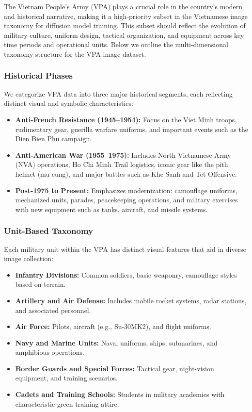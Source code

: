 \documentclass[conference]{IEEEtran}
\begin{document}
The Vietnam People's Army (VPA) plays a crucial role in the country's modern and historical narrative, making it a high-priority subset in the Vietnamese image taxonomy for diffusion model training. This subset should reflect the evolution of military culture, uniform design, tactical organization, and equipment across key time periods and operational units. Below we outline the multi-dimensional taxonomy structure for the VPA image dataset.

\subsubsection{Historical Phases}

We categorize VPA data into three major historical segments, each reflecting distinct visual and symbolic characteristics:

\begin{itemize}
	\item \textbf{Anti-French Resistance (1945--1954):} Focus on the Viet Minh troops, rudimentary gear, guerilla warfare uniforms, and important events such as the Dien Bien Phu campaign.
	\item \textbf{Anti-American War (1955--1975):} Includes North Vietnamese Army (NVA) operations, Ho Chi Minh Trail logistics, iconic gear like the pith helmet (mu cung), and major battles such as Khe Sanh and Tet Offensive.
	\item \textbf{Post-1975 to Present:} Emphasizes modernization: camouflage uniforms, mechanized units, parades, peacekeeping operations, and military exercises with new equipment such as tanks, aircraft, and missile systems.
\end{itemize}

\subsubsection{Unit-Based Taxonomy}

Each military unit within the VPA has distinct visual features that aid in diverse image collection:

\begin{itemize}
	\item \textbf{Infantry Divisions:} Common soldiers, basic weaponry, camouflage styles based on terrain.
	\item \textbf{Artillery and Air Defense:} Includes mobile rocket systems, radar stations, and associated personnel.
	\item \textbf{Air Force:} Pilots, aircraft (e.g., Su-30MK2), and flight uniforms.
	\item \textbf{Navy and Marine Units:} Naval uniforms, ships, submarines, and amphibious operations.
	\item \textbf{Border Guards and Special Forces:} Tactical gear, night-vision equipment, and training scenarios.
	\item \textbf{Cadets and Training Schools:} Students in military academies with characteristic green training attire.
\end{itemize}
\end{document}
